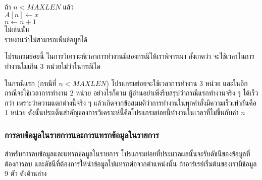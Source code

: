 \begin{algt}
\\
\hspace*{0.2in} ถ้า $n < MAXLEN$ แล้ว\\
\hspace*{0.2in}\hspace*{0.2in} $A[n] \leftarrow x$\\
\hspace*{0.2in}\hspace*{0.2in} $n \leftarrow n + 1$\\
\hspace*{0.2in} ไม่{\wbr}เช่นนั้น\\
\hspace*{0.2in}\hspace*{0.2in} รายงาน{\wbr}ว่า{\wbr}ไม่{\wbr}สามารถ{\wbr}เพิ่ม{\wbr}ข้อมูล{\wbr}ได้{\wbr}
\end{algt}

โปรแกรมย่อย{\wbr}นี้ ใน{\wbr}การ{\wbr}วิเคราะห์{\wbr}เวลา{\wbr}การ{\wbr}ทำงาน{\wbr}มี{\wbr}สอง{\wbr}กรณี{\wbr}ให้{\wbr}เรา{\wbr}พิจารณา สังเกต{\wbr}ว่า{\wbr}
จะ{\wbr}ใช้เวลา{\wbr}ใน{\wbr}การ{\wbr}ทำงาน{\wbr}ไม่{\wbr}เกิน $3$ หน่วย{\wbr}ไม่ว่า{\wbr}ใน{\wbr}กรณี{\wbr}ใด 

ใน{\wbr}กรณี{\wbr}แรก (กรณี{\wbr}ที่ $n<MAXLEN$) โปรแกรมย่อย{\wbr}จะ{\wbr}ใช้เวลา{\wbr}การ{\wbr}ทำงาน $3$ หน่วย{\wbr}
และ{\wbr}ใน{\wbr}อีก{\wbr}กรณี{\wbr}จะ{\wbr}ใช้เวลา{\wbr}การ{\wbr}ทำงาน $2$ หน่วย อย่างไรก็ตาม{\wbr}
ผู้อ่าน{\wbr}อย่า{\wbr}เพิ่ง{\wbr}รีบ{\wbr}สรุป{\wbr}ว่า{\wbr}กรณี{\wbr}แรก{\wbr}ทำงาน{\wbr}จริง ๆ ได้{\wbr}เร็ว{\wbr}กว่า เพราะว่า{\wbr}ความ{\wbr}แตกต่าง{\wbr}นี้{\wbr}จริง ๆ
แล้ว{\wbr}เกิด{\wbr}จาก{\wbr}ข้อสมมติ{\wbr}ว่า{\wbr}การ{\wbr}ทำงาน{\wbr}ใน{\wbr}ทุก{\wbr}คำสั่ง{\wbr}มี{\wbr}ความ{\wbr}เร็ว{\wbr}เท่า{\wbr}กัน{\wbr}คือ 1 หน่วย{\wbr}
ดังนั้น{\wbr}ประเด็น{\wbr}สำคัญ{\wbr}ของ{\wbr}การ{\wbr}วิเคราะห์{\wbr}นี้{\wbr}คือ{\wbr}โปรแกรมย่อย{\wbr}นี้{\wbr}ทำงาน{\wbr}ใน{\wbr}เวลา{\wbr}ที่{\wbr}ไม่{\wbr}ขึ้น{\wbr}กับ{\wbr}ค่า $n$

\subsubsection{การ{\wbr}ลบ{\wbr}ข้อมูล{\wbr}ใน{\wbr}รายการ{\wbr}และ{\wbr}การ{\wbr}แทรก{\wbr}ข้อมูล{\wbr}ใน{\wbr}รายการ}

สำหรับ{\wbr}การ{\wbr}ลบ{\wbr}ข้อมูล{\wbr}และ{\wbr}แทรก{\wbr}ข้อมูล{\wbr}ใน{\wbr}รายการ{\wbr}
โปรแกรมย่อย{\wbr}ที่{\wbr}ประมวลผล{\wbr}นั้น{\wbr}จะ{\wbr}รับ{\wbr}ดัชนี{\wbr}ของ{\wbr}ข้อมูล{\wbr}ที่{\wbr}ต้องการ{\wbr}ลบ{\wbr}
และ{\wbr}ดัชนี{\wbr}ที่{\wbr}ต้องการ{\wbr}ให้{\wbr}นำ{\wbr}ข้อมูล{\wbr}ไป{\wbr}แทรก{\wbr}ต่อ{\wbr}จาก{\wbr}ตำแหน่ง{\wbr}นั้น{\wbr}
ถ้า{\wbr}อาร์เรย์{\wbr}เริ่มต้น{\wbr}ของ{\wbr}เรา{\wbr}มี{\wbr}ข้อมูล 9 ตัว ดัง{\wbr}ด้าน{\wbr}ล่าง{\wbr}

